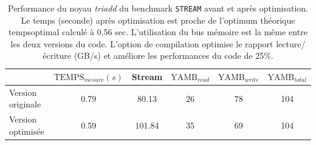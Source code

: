             \begin{table}[htbp]
            \centering
                        \begin{tabular}{l|c|c|c|c|c|}
            \cline{2-6}
            & $\text{TEMPS}_{mesure} (s)$ & Stream   & $\text{YAMB}_{read}$  & $\text{YAMB}_{write}$  & $\text{YAMB}_{total}$  \\ \hline
            \multicolumn{1}{|l|}{Version originale}  & 0.79   & 80.13  & 26        & 78         & 104        \\ \hline
            \multicolumn{1}{|l|}{Version optimisée} & 0.59   & 101.84 & 35        & 69         & 104        \\ \hline
            \end{tabular}
            \caption{Performance du noyau \textit{triadd} du benchmark \texttt{STREAM} avant et après optimisation. Le temps (seconde) après optimisation est proche de l'optimum théorique \gls{tempsoptimal}  calculé à 0,56 sec. L'utilisation du bus mémoire est la même entre les deux versions du code. L'option de compilation optimise le rapport lecture/écriture (GB/s) et améliore les performances du code de 25\%.}
            \label{table:stream_res}
            \end{table}